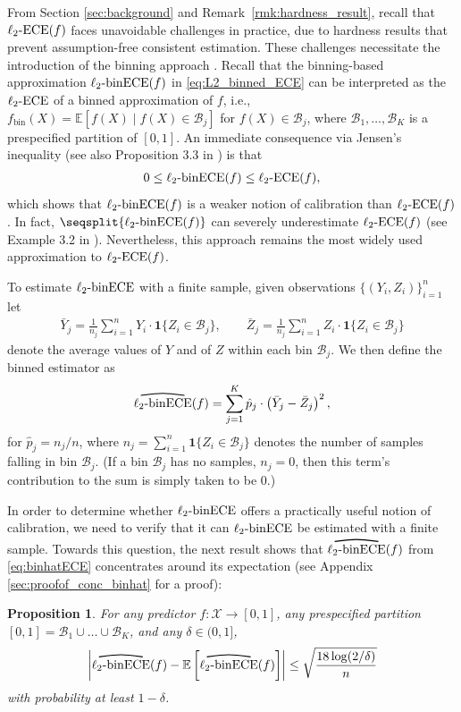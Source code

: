\documentclass[11pt]{article}
\numberwithin{equation}{section}
\newtheorem{proposition}{Proposition}[section]
\theoremstyle{definition}
\newcommand{\E}{\mathbb{E}}
\newcommand{\cB}{\mathcal{B}}
\newcommand{\cX}{\mathcal{X}}
\newcommand{\one}{\bm{1}}
\newcommand{\ra}{\rightarrow}
\newcommand{\myoverline}[2][3.5em]{%
  \overset{%
    \tikz[baseline=-0.1ex]{
      \draw[line width=0.75pt]
        (0,0) .. controls (#1/2,0.5ex) .. (#1,0);
    }%
  }{#2}%
}
\newcommand{\ECE}{\mathrm{ECE}}
\newcommand{\lECE}{\ell_2\textnormal{-}\ECE}
\newcommand{\binECE}{\mathrm{binECE}}
\newcommand{\lbinECE}{\ell_2\textnormal{-}\binECE}
\newcommand{\binhatECE}{\myoverline{\lbinECE}}
\begin{document}
From Section \ref{sec:background} and Remark~\ref{rmk:hardness_result}, recall that $\lECE(f)$ faces unavoidable challenges in practice, due to hardness results that prevent assumption-free consistent estimation. These challenges necessitate the introduction of the binning approach \citep{zadrozny2001obtaining,zadrozny2002transforming,futami2024information}. Recall that the binning-based approximation $\lbinECE(f)$ in \eqref{eq:L2_binned_ECE} can be interpreted as the $\lECE$ of a binned approximation of $f$, i.e., $f_{\mathrm{bin}}(X) = \E[f(X) \mid f(X)\in \cB_j]$ for $f(X)\in\cB_j$, where $\cB_1,\dots,\cB_K$ is a prespecified partition of $[0,1]$. An immediate consequence via Jensen’s inequality (see also Proposition 3.3 in \cite{kumar2019verified}) is that
\begin{align*}
    0 \leq \lbinECE(f) \leq \lECE(f),
\end{align*}
which shows that $\lbinECE(f)$ is a weaker notion of calibration than $\lECE(f)$. In fact, $\seqsplit{\lbinECE(f)}$ can severely underestimate $\lECE(f)$ (see Example 3.2 in \cite{kumar2019verified}). Nevertheless, this approach remains the most widely used approximation to $\lECE(f)$. 

To estimate $\lbinECE$ with a finite sample, given observations $\{(Y_i, Z_i)\}_{i=1}^n$ let
\begin{align*}
\bar Y_j = \frac{1}{n_j}\sum_{i=1}^{n}Y_i\cdot \one\{Z_i \in \cB_j\},
\qquad
\bar Z_j = \frac{1}{n_j}\sum_{i=1}^{n}Z_i\cdot \one\{Z_i \in \cB_j\}
\end{align*}
denote the average values of $Y$ and of $Z$ within each bin $\cB_j$. We then define the binned estimator as
\begin{align}\label{eq:binhatECE}
\binhatECE(f) = \sum_{j=1}^{K}\hat p_j\cdot \left(\bar Y_j - \bar Z_j\right)^2,
\end{align}
for $\hat p_j = n_j/n$, where $n_j = \sum_{i=1}^{n}\one\{Z_i \in \cB_j\}$ denotes the number of samples falling in bin $\cB_j$. (If a bin $\cB_j$ has no samples, $n_j=0$, then this term's contribution to the sum is simply taken to be $0$.)

In order to determine whether $\lbinECE$ offers a practically useful notion of calibration, we need to verify that it can $\lbinECE$ be estimated with a finite sample. Towards this question, the next result shows that $\binhatECE(f)$ from \eqref{eq:binhatECE} concentrates around its expectation (see Appendix \ref{sec:proofof_conc_binhat} for a proof):

\begin{proposition}\label{prop:conc_binhat}
    For any predictor $f:\cX\ra[0,1]$, any prespecified partition $[0,1]=\cB_1\cup\dots\cup\cB_K$, and any $\delta\in (0,1]$,
    \begin{align*}
        \left|\binhatECE(f) - \E\left[\binhatECE(f)\right]\right|\leq \sqrt{\frac{18\log (2/\delta)}{n}}
    \end{align*}
    with probability at least $1-\delta$.
\end{proposition}
\end{document}
